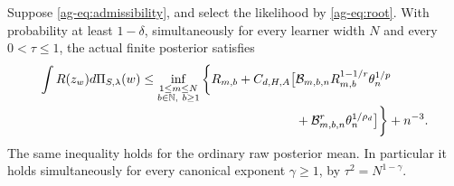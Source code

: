 \begin{theorem}
\label{ag-thm:main}
Suppose \eqref{ag-eq:admissibility}, and select the likelihood by \eqref{ag-eq:root}. With probability at least $1-\delta$, simultaneously for every learner width $N$ and every $0<\tau\le1$, the actual finite posterior satisfies
\begin{align}
 \int R(z_w)d\Pi_{S,\lambda}(w)
 \le\inf_{\substack{1\le m\le N\\b\in\mathbb N,\ b\ge1}}
 \bigg\{R_{m,b}+C_{d,H,A}\big[&
 \mathcal B_{m,b,n} R_{m,b}^{1-1/r}\theta_n^{1/p}
 \notag\\[-2pt]
 &+\mathcal B_{m,b,n}^r\theta_n^{1/\rho_d}\big]\bigg\}+n^{-3}.
 \label{ag-eq:population-oracle}
\end{align}
The same inequality holds for the ordinary raw posterior mean. In particular it holds simultaneously for every canonical exponent $\gamma\ge1$, by $\tau^2=N^{1-\gamma}$.
\end{theorem}

